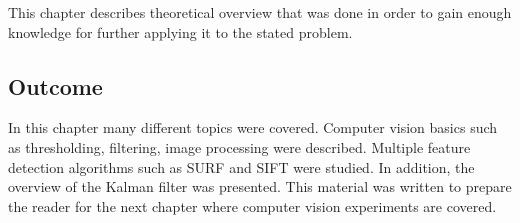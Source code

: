 \documentclass[../../main]{subfiles}
\begin{document}
This chapter describes theoretical overview that was done in order to gain enough knowledge for further applying it to the stated problem.


\newpage


\newpage

\subsection{Outcome}

In this chapter many different topics were covered. Computer vision basics such as thresholding, filtering, image processing were described. Multiple feature detection algorithms such as \ac{SURF} and \ac{SIFT} were studied. In addition, the overview of the Kalman filter was presented. This material was written to prepare the reader for the next chapter where computer vision experiments are covered.
\end{document}

